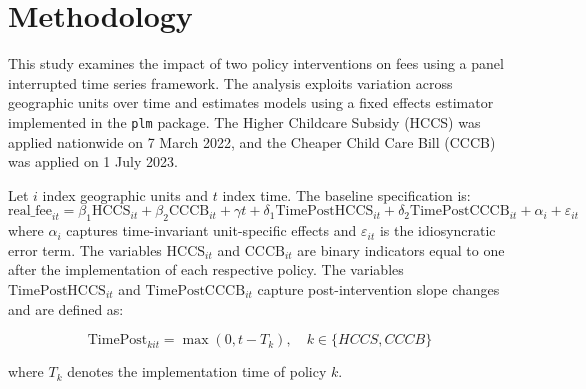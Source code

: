 \documentclass[12pt]{article}
\begin{document}
\section{Methodology}
This study examines the impact of two policy interventions on fees using a panel interrupted time series framework. The analysis exploits variation across geographic units over time and estimates models using a fixed effects estimator implemented in the \texttt{plm} package. The Higher Childcare Subsidy (HCCS) was applied nationwide on 7 March 2022, and the Cheaper Child Care Bill (CCCB) was applied on 1 July 2023. 

Let $i$ index geographic units and $t$ index time. The baseline specification is:
\begin{equation}
\text{real\_fee}_{it} =
\beta_1 \text{HCCS}_{it}
+ \beta_2 \text{CCCB}_{it}
+ \gamma t
+ \delta_1 \text{TimePostHCCS}_{it}
+ \delta_2 \text{TimePostCCCB}_{it}
+ \alpha_i
+ \varepsilon_{it}
\end{equation}
where $\alpha_i$ captures time-invariant unit-specific effects and $\varepsilon_{it}$ is the idiosyncratic error term. The variables $\text{HCCS}_{it}$ and $\text{CCCB}_{it}$ are binary indicators equal to one after the implementation of each respective policy. The variables $\text{TimePostHCCS}_{it}$ and $\text{TimePostCCCB}_{it}$ capture post-intervention slope changes and are defined as:

\begin{equation}
\text{TimePost}_{kit} = \max(0, t - T_k), \quad k \in \{HCCS,CCCB\}
\end{equation}

where $T_k$ denotes the implementation time of policy $k$.

\clearpage
\end{document}
